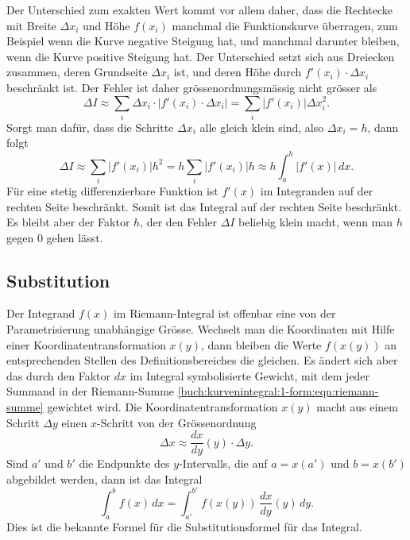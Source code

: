 Der Unterschied zum exakten Wert kommt vor allem daher, dass die
Rechtecke mit Breite $\Delta x_i$ und Höhe $f(x_i)$ manchmal
die Funktionskurve überragen, zum Beispiel wenn die Kurve negative
Steigung hat, und manchmal darunter bleiben, wenn die Kurve positive
Steigung hat.
Der Unterschied setzt sich aus Dreiecken zusammen, deren Grundseite
$\Delta x_i$ ist, und deren Höhe durch $f'(x_i)\cdot \Delta x_i$
beschränkt ist.
Der Fehler ist daher grössenordnungsmässig nicht grösser als
\[
\Delta I
\approx
\sum_i \Delta x_i \cdot |f'(x_i)\cdot \Delta x_i|
=
\sum_i |f'(x_i)| \Delta x_i^2.
\]
Sorgt man dafür, dass die Schritte $\Delta x_i$ alle gleich klein
sind, also $\Delta x_i=h$, dann folgt
\[
\Delta I
\approx
\sum_i |f'(x_i)| h^2
=
h\sum_i |f'(x_i)|h
\approx
h\int_a^b |f'(x)|\,dx.
\]
Für eine stetig differenzierbare Funktion ist $f'(x)$ im Integranden
auf der rechten Seite beschränkt.
Somit ist das Integral auf der rechten Seite beschränkt.
Es bleibt aber der Faktor $h$, der den Fehler $\Delta I$ beliebig
klein macht, wenn man $h$ gegen $0$ gehen lässt.

%
%
\subsection{Substitution}
%
Der Integrand $f(x)$ im Riemann-Integral ist offenbar eine von
der Parametrisierung unabhängige Grösse.
Wechselt man die Koordinaten mit Hilfe einer Koordinatentransformation
$x(y)$, dann bleiben die Werte $f(x(y))$ an entsprechenden Stellen
des Definitionsbereiches die gleichen.
Es ändert sich aber das durch den Faktor $dx$ im Integral symbolisierte
Gewicht, mit dem jeder Summand in der Riemann-Summe
%
\eqref{buch:kurvenintegral:1-form:eqn:riemann-summe}
gewichtet wird.
Die Koordinatentransformation $x(y)$ macht aus einem Schritt $\Delta y$
einen $x$-Schritt von der Grössenordnung
\[
\Delta x
\approx
\frac{dx}{dy}(y)\cdot \Delta y.
\]
Sind $a'$ und $b'$ die Endpunkte des $y$-Intervalls, die auf 
$a=x(a')$ und $b=x(b')$ abgebildet werden, dann ist das
Integral
\begin{equation}
\int_a^b f(x)\,dx
=
\int_{a'}^{b'} f(x(y)) \, \frac{dx}{dy}(y)\,dy.
\label{buch:kurvenintegral:1-form:eqn:substitution}
\end{equation}
Dies ist die bekannte Formel für die Substitutionsformel für das Integral.
%

%
%

